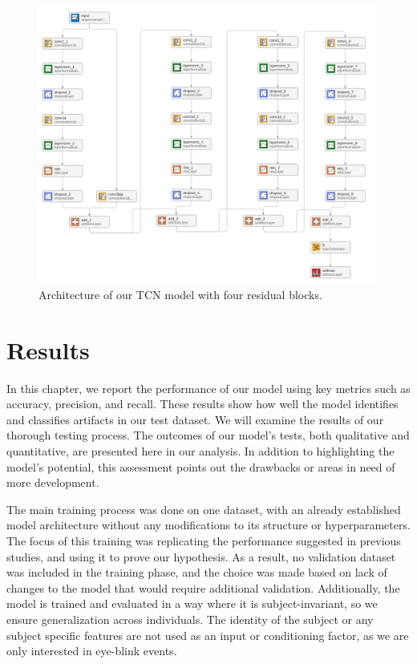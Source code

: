 \documentclass[12pt,a4paper,titlepage,openany]{report}
\begin{document}
\begin{figure}[H]
    \centering
    \includegraphics[width=1\linewidth]{images/Chapter3_Methodology/tcn-model.png}
    \caption{Architecture of our TCN model with four residual blocks.}
    \label{fig:tcn-model}
\end{figure}


\chapter{Results}
\thispagestyle{fancy}

In this chapter, we report the performance of our model using key metrics such as accuracy, precision, and recall. These results show how well the model identifies and classifies artifacts in our test dataset.
We will examine the results of our thorough testing process. The outcomes of our model's tests, both qualitative and quantitative, are presented here in our analysis. In addition to highlighting the model's potential, this assessment points out the drawbacks or areas in need of more development.

The main training process was done on one dataset, with an already established model architecture without any modifications to its structure or hyperparameters. The focus of this training was replicating the performance suggested in previous studies, and using it to prove our hypothesis. As a result, no validation dataset was included in the training phase, and the choice was made based on lack of changes to the model that would require additional validation. 
Additionally, the model is trained and evaluated in a way where it is subject-invariant, so we ensure generalization across individuals. The identity of the subject or any subject specific features are not used as an input or conditioning factor, as we are only interested in eye-blink events.
\end{document}
